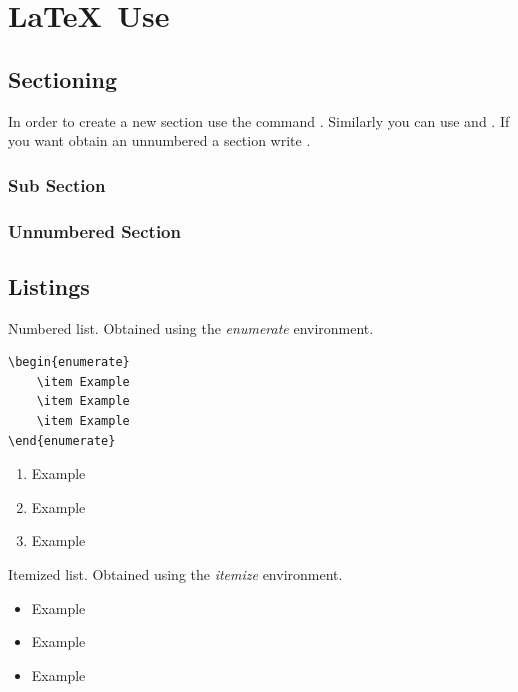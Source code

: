 
\pagestyle{fancy}

\chapter{\LaTeX \, Use}
\label{ch:latex}

\section{Sectioning}
\label{example-Section}

In order to create a new section use the command . Similarly you can use  and . If you want obtain an unnumbered a section write .

\subsection{Sub Section}
\subsection*{Unnumbered Section}

\section{Listings}

Numbered list. Obtained using the \textit{enumerate} environment.
\begin{verbatim}
\begin{enumerate}
	\item Example 
	\item Example 
	\item Example	
\end{enumerate}
\end{verbatim}

\begin{enumerate}
	\item Example 
	\item Example 
	\item Example	
\end{enumerate}

Itemized list. Obtained using the \textit{itemize} environment.
\begin{itemize}
	\item Example
	\item Example
	\item Example	
\end{itemize}


